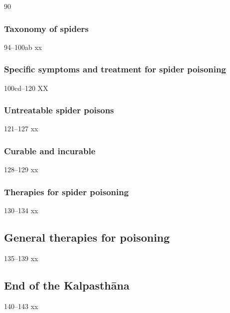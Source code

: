 \begin{translation}
\item[90]        

 
 
 
 \subsubsection{Taxonomy of spiders}
 
 \item[94--100ab] xx
 
 \subsubsection{Specific symptoms and treatment for spider 
 poisoning}
 
 \item[100cd--120] XX
 
 \subsubsection{Untreatable spider poisons}
 
 \item [121--127] xx
 
 \subsubsection{Curable and incurable}
 
 \item[128--129] xx
 
 \subsubsection{Therapies for spider poisoning}
 
 \item [130--134] xx
 
\subsection{General therapies for poisoning}

\item [135--139] xx

\subsection{End of the Kalpasthāna}

\item[140--143] xx
 
\end{translation}